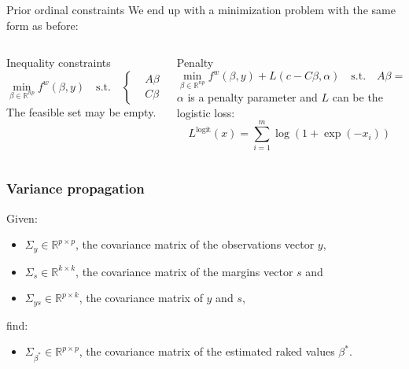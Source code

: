 \documentclass[aspectratio=169]{beamer}
\begin{document}
\begin{frame}{Prior ordinal constraints}
	We end up with a minimization problem with the same form as before:

	\vspace{3em}

	\begin{columns}[t]

	\begin{column}{.45\textwidth}
		Inequality constraints
		\begin{equation*}
		\min_{\beta \in \mathbb{R}^{n p}} f^w \left( \beta , y \right) \quad \mbox{s.t.} \quad \left\{
		\begin{aligned}
		& A \beta = s, \\
		& C \beta \leq c
		\end{aligned}
		\right.
		\end{equation*}
		The feasible set may be empty. 
	\end{column}
	
	\begin{column}{.45\textwidth}
		Penalty
		\begin{equation*}
		\min_{\beta \in \mathbb{R}^{n p}} f^w \left( \beta , y \right) + L \left( c - C \beta , \alpha \right) \quad \mbox{s.t.} \quad A \beta = s
		\end{equation*}
		$\alpha$ is a penalty parameter and $L$ can be the logistic loss:
		\begin{equation*}
		L^{\text{logit}} \left( x \right) = \sum_{i = 1}^m \log \left( 1 + \exp \left( - x_i \right) \right)
		\end{equation*}
	\end{column}

	\end{columns}
\end{frame}

\begin{frame}
	\frametitle{Variance propagation}
	Given:

	\begin{itemize}
	\item $\Sigma_y \in \mathbb{R}^{p \times p}$, the covariance matrix of the observations vector $y$,
	\item $\Sigma_s \in \mathbb{R}^{k \times k}$, the covariance matrix of the margins vector $s$ and
	\item $\Sigma_{y s} \in \mathbb{R}^{p \times k}$, the covariance matrix of $y$ and $s$,
	\end{itemize}

	\vspace{1em}

	find:

	\begin{itemize}
	\item $\Sigma_{\beta^*} \in \mathbb{R}^{p \times p}$, the covariance matrix of the estimated raked values $\beta^*$.
	\end{itemize}
\end{frame}
\end{document}
